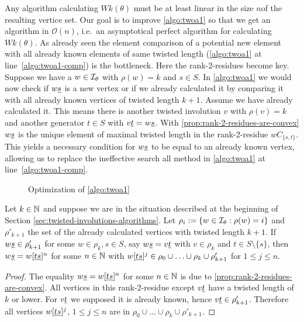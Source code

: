 Any algorithm calculating $Wk(\theta)$ must be at least linear in the size $n$of the resulting vertice set. Our goal is to improve \ref{algo:twoa1} so that we get an algorithm in $\mathcal{O}(n)$, i.e.\ an asymptotical perfect algorithm for calculating $Wk(\theta)$. As already seen the element comparison of a potential new element with all already known elements of same twisted length (\ref{algo:twoa1} at line~\ref{algo:twoa1-comp}) is the bottleneck. Here the rank-2-residues become key. Suppose we have a $w \in \mathcal{I}_{\theta}$ with $\rho(w) = k$ and $s \in S$. In \ref{algo:twoa1} we would now check if $w \underline{s}$ is a new vertex or if we already calculated it by comparing it with all already known vertices of twisted length $k + 1$. Assume we have already calculated it. This means there is another twisted involution $v$ with $\rho(v) = k$ and another generator $t \in S$ with $v \underline{t} = w \underline{s}$. With \ref{prop:rank-2-residues-are-convex} $w \underline{s}$ is the unique element of maximal twisted length in the rank-2-residue $wC_{\{s,t\}}$. This yields a necessary condition for $w \underline{s}$ to be equal to an already known vertex, allowing us to replace the ineffective search all method in \ref{algo:twoa1} at line~\ref{algo:twoa1-comp}.

\begin{figure}[ht]
	\centering
	
	\caption{Optimization of \ref{algo:twoa1}}
	\label{fig:optimization-of-twoa1}
\end{figure}

\begin{prop}
	Let $k \in \mathbb{N}$ and suppose we are in the situation described at the beginning of Section \ref{sec:twisted-involutions-algorithms}. Let $\rho_i := \{ w \in \mathcal{I}_{\theta} : \rho(w) = i \}$ and $\rho'_{k+1}$ the set of the already calculated vertices with twisted length $k+1$. If $w \underline{s} \in \rho'_{k+1}$ for some $w \in \rho_k, s \in S$, say $w \underline{s} = v \underline{t}$ with $v \in \rho_k$ and $t \in S \setminus \{s\}$, then $w \underline{s} = w[\underline{t} \underline{s}]^n$ for some $n \in \mathbb{N}$ with $w[\underline{t} \underline{s}]^j \in \rho_0 \cup \ldots \cup \rho_k \cup \rho'_{k+1}$ for $1 \leq j \leq n$.

	\begin{proof}
		The equality $w \underline{s} = w[\underline{t} \underline{s}]^n$ for some $n \in \mathbb{N}$ is due to \ref{prop:rank-2-residues-are-convex}. All vertices in this rank-2-residue except $v \underline{t}$ have a twisted length of $k$ or lower. For $v \underline{t}$ we supposed it is already known, hence $v \underline{t} \in \rho'_{k+1}$. Therefore all vertices $w[\underline{t} \underline{s}]^j$, $1 \leq j \leq n$ are in $\rho_0 \cup \ldots \cup \rho_k \cup \rho'_{k+1}$.
	\end{proof}
\end{prop}

